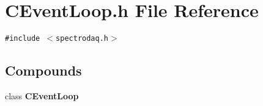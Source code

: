 \section{CEvent\-Loop.h File Reference}
\label{CEventLoop_8h}
{\tt \#include $<$spectrodaq.h$>$}\par
\subsection*{Compounds}
\begin{CompactItemize}
\item 
class {\bf CEvent\-Loop}
\end{CompactItemize}
